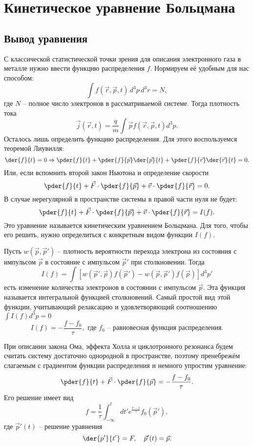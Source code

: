 \section{Кинетическое уравнение Больцмана}
\subsection{Вывод уравнения}

С классической статистической точки зрения для описания электронного газа в
металле нужно ввести функцию распределения \( f \). Нормируем её удобным для
нас способом:
\[
    \int f(\vec{r},\vec{p},t)\,d^3p\,d^3r = N,
\]
где \( N \) -- полное число электронов в рассматриваемой системе. Тогда
плотность тока
\[
    \vec{j}(\vec{r},t) = \frac{q}{m} \int \vec{p} f(\vec{r},\vec{p},t) d^3p.
\]
Осталось лишь определить функцию распределения. Для этого воспользуемся теоремой
Лиувилля:
\[
    \der{f}{t} = 0 \Rightarrow
    \pder{f}{t} + \pder{f}{\vec{p}}\der{\vec{p}}{t} +
    \pder{f}{\vec{r}}\der{\vec{r}}{t} = 0.
\]
Или, если вспомнить второй закон Ньютона и определение скорости
\[
    \pder{f}{t} + \vec{F}\cdot\pder{f}{\vec{p}} + \vec{v}\cdot\pder{f}{\vec{r}}
    = 0.
\]
В случае нерегулярной в пространстве системы в правой части нуля не будет:
\[
    \pder{f}{t} + \vec{F}\cdot\pder{f}{\vec{p}} + \vec{v}\cdot\pder{f}{\vec{r}}
    = I(f).
\]
Это уравнение называется кинетическим уравнением Больцмана. Для того, чтобы его
решить, нужно определиться с конкретным видом функции \( I(f) \).

Пусть \( w(\vec{p},\vec{p}') \) -- плотность вероятности перехода электрона из
состояния с импульсом \( \vec{p} \) в состояние с импульсом \( \vec{p}' \) при
столкновении. Тогда
\[
    I(f) =
        \int [w(\vec{p}',\vec{p})f(\vec{p}')-w(\vec{p},\vec{p}')f(\vec{p})]d^3p'
\]
есть изменение количества электронов в состоянии с импульсом \( \vec{p} \). Эта
функция называется интегральной функцией столкновений. Самый простой вид этой
функции, учитывающий релаксацию и удовлетворяющий соотношению
\( \int I(f) d^3p = 0 \)
\[
    I(f) = -\frac{f - f_0}{\tau},\text{ где } f_0
    \text{ -- равновесная функция распределения.}
\]

При описании закона Ома, эффекта Холла и циклотронного резонанса будем считать
систему достаточно однородной в пространстве, поэтому пренебрежём слагаемым с
градиентом функции распределения и немного упростим уравнение:
\[
    \pder{f}{t} + \vec{F}\cdot\pder{f}{\vec{p}} = -\frac{f-f_0}{\tau}.
\]
Его решение имеет вид
\[
    f = \frac{1}{\tau}\int_{-\infty}^t dt' e^\frac{t'-t}{\tau} f_0(\vec{p}'),
\]
где \( \vec{p}'(t) \) -- решение уравнения
\[
    \der{p'}{t'} = F, \quad \vec{p}'(t) = \vec{p}.
\]


